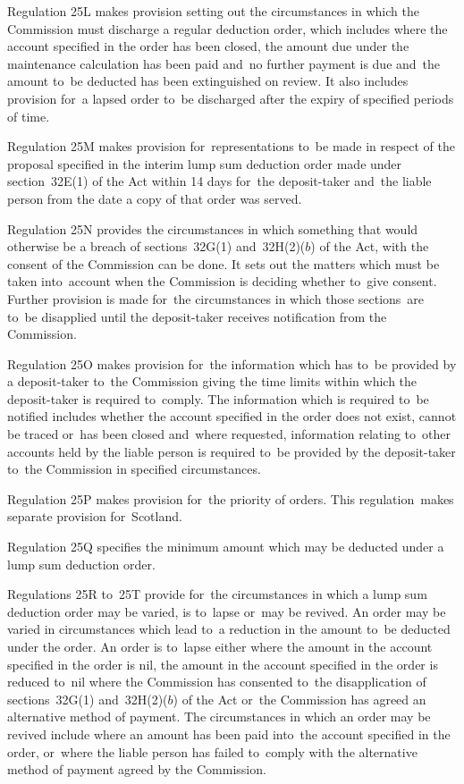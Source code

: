 \documentclass[12pt,a4paper]{article}
\begin{document}
Regulation 25L makes provision setting out the circumstances in which the Commission must discharge a regular deduction order, which includes where the account specified in the order has been closed, the amount due under the maintenance calculation has been paid and~no further payment is due and~the amount to~be deducted has been extinguished on review. It also includes provision for~a lapsed order to~be discharged after the expiry of specified periods of time.

Regulation 25M makes provision for~representations to~be made in respect of the proposal specified in the interim lump sum deduction order made under section~32E(1) of the Act within 14 days for~the deposit-taker and~the liable person from the date a copy of that order was served.

Regulation 25N provides the circumstances in which something that would otherwise be a breach of sections~32G(1) and~32H(2)($b$)  of the Act, with the consent of the Commission can be done. It sets out the matters which must be taken into~account when the Commission is deciding whether to~give consent. Further provision is made for~the circumstances in which those sections~are to~be disapplied until the deposit-taker receives notification from the Commission.

Regulation 25O makes provision for~the information which has to~be provided by a deposit-taker to~the Commission giving the time limits within which the deposit-taker is required to~comply. The information which is required to~be notified includes whether the account specified in the order does not exist, cannot be traced or~has been closed and~where requested, information relating to~other accounts held by the liable person is required to~be provided by the deposit-taker to~the Commission in specified circumstances.

Regulation 25P makes provision for~the priority of orders. This regulation~makes separate provision for~Scotland.

Regulation 25Q specifies the minimum amount which may be deducted under a lump sum deduction order.

Regulations 25R to~25T provide for~the circumstances in which a lump sum deduction order may be varied, is to~lapse or~may be revived. An order may be varied in circumstances which lead to~a reduction in the amount to~be deducted under the order. An order is to~lapse either where the amount in the account specified in the order is nil, the amount in the account specified in the order is reduced to~nil where the Commission has consented to~the disapplication of sections~32G(1) and~32H(2)($b$)  of the Act or~the Commission has agreed an alternative method of payment. The circumstances in which an order may be revived include where an amount has been paid into~the account specified in the order, or~where the liable person has failed to~comply with the alternative method of payment agreed by the Commission.
\end{document}
